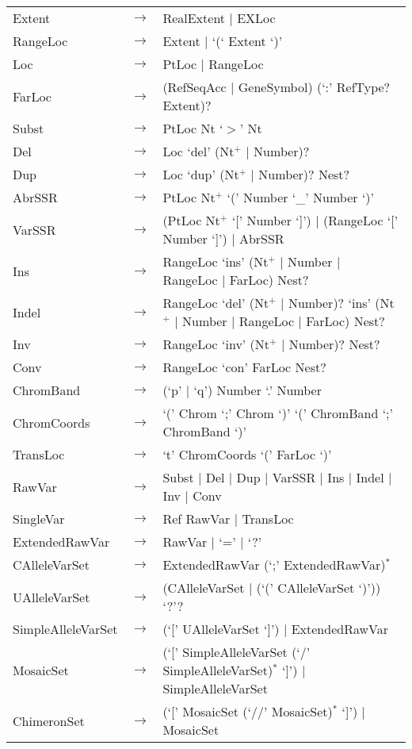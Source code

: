 \begin{longtable}{llp{7cm}}
Extent & $\rightarrow$ & RealExtent $|$ EXLoc\\
RangeLoc & $\rightarrow$ & Extent $|$ `(` Extent `)'\\
Loc & $\rightarrow$ & PtLoc $|$ RangeLoc\\
FarLoc & $\rightarrow$ & (RefSeqAcc $|$ GeneSymbol) (`:' RefType? Extent)? \\
Subst & $\rightarrow$ & PtLoc Nt `$>$' Nt\\
Del & $\rightarrow$ & Loc `del' (Nt$^+$ $|$ Number)?\\
Dup & $\rightarrow$ & Loc `dup' (Nt$^+$ $|$ Number)? Nest?\\
AbrSSR & $\rightarrow$ & PtLoc  Nt$^+$ `(' Number `\_' Number `)'\\
VarSSR & $\rightarrow$ & (PtLoc  Nt$^+$ `[' Number `]') $|$ (RangeLoc `[' Number `]') $|$ AbrSSR\\
Ins & $\rightarrow$ & RangeLoc `ins' (Nt$^+$ $|$ Number $|$ RangeLoc $|$ FarLoc) Nest?\\
Indel & $\rightarrow$ & RangeLoc `del' (Nt$^+$ $|$ Number)? `ins' (Nt$^+$ $|$ Number $|$ RangeLoc $|$ FarLoc) Nest?\\
Inv & $\rightarrow$ & RangeLoc `inv' (Nt$^+$ $|$ Number)? Nest?\\
Conv & $\rightarrow$ & RangeLoc `con' FarLoc Nest?\\
ChromBand & $\rightarrow$ & (`p' $|$ `q') Number `.' Number\\
ChromCoords & $\rightarrow$ & `(' Chrom `;' Chrom `)' `(' ChromBand `;' ChromBand `)'\\
TransLoc & $\rightarrow$ & `t' ChromCoords `(' FarLoc `)'\\
RawVar & $\rightarrow$ & Subst $|$ Del $|$ Dup $|$ VarSSR $|$ Ins $|$ Indel $|$ Inv $|$ Conv\\
SingleVar & $\rightarrow$ & Ref RawVar $|$ TransLoc\\
ExtendedRawVar & $\rightarrow$ & RawVar $|$ `=' $|$ `?'\\
CAlleleVarSet & $\rightarrow$ & ExtendedRawVar (`;' ExtendedRawVar)$^*$\\
UAlleleVarSet & $\rightarrow$ & (CAlleleVarSet $|$ (`(' CAlleleVarSet `)')) `?'?\\
SimpleAlleleVarSet & $\rightarrow$ & (`[' UAlleleVarSet `]') $|$ ExtendedRawVar\\
MosaicSet & $\rightarrow$ & (`[' SimpleAlleleVarSet (`/' SimpleAlleleVarSet)$^*$ `]') $|$ SimpleAlleleVarSet\\
ChimeronSet & $\rightarrow$ & (`[' MosaicSet (`//' MosaicSet)$^*$ `]') $|$ MosaicSet\\

\end{longtable}

